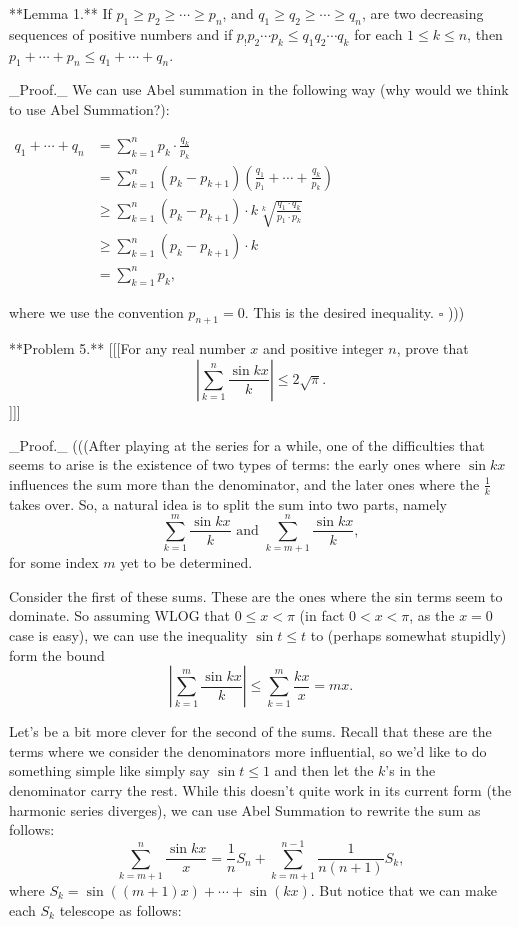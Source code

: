 **Lemma 1.** If $p_1 \geq p_2 \geq \cdots \geq p_n$, and $q_1 \geq q_2 \geq \cdots \geq q_n$, are two decreasing sequences of positive numbers and if $p_! p_2 \cdots p_k \leq q_1 q_2 \cdots q_k$ for each $1 \leq k \leq n$, then $p_1 + \cdots + p_n \leq q_1 + \cdots + q_n$.  


_Proof._ We can use Abel summation in the following way (why would we think to use Abel Summation?):  

$\begin{align*}
q_1 + \cdots + q_n
&= \sum_{k=1}^n p_k \cdot \frac{q_k}{p_k} \\
&= \sum_{k=1}^n (p_k - p_{k+1}) \left( \frac{q_1}{p_1} + \cdots + \frac{q_k}{p_k} \right) \\
&\geq \sum_{k=1}^n (p_k - p_{k+1}) \cdot k \sqrt[k]{\frac{q_1 \cdot q_k}{p_1 \cdot p_k}} \\
&\geq \sum_{k=1}^n (p_k - p_{k+1}) \cdot k \\
&= \sum_{k=1}^n p_k, 
\end{align*}$  

where we use the convention $p_{n+1} = 0$. This is the desired inequality. $\square$  )))

**Problem 5.** [[[For any real number $x$ and positive integer $n$, prove that  
\[ \left | \sum_{k=1}^n \frac{\sin kx}{k} \right | \leq 2 \sqrt{\pi}. \] ]]]

_Proof._ (((After playing at the series for a while, one of the difficulties that seems to arise is the existence of two types of terms: the early ones where $\sin kx$ influences the sum more than the denominator, and the later ones where the $\frac{1}{k}$ takes over. So, a natural idea is to split the sum into two parts, namely  
\[ \sum_{k=1}^m \frac{\sin kx}{k} \text{ and } \sum_{k=m+1}^n \frac{\sin kx}{k}, \]  
for some index $m$ yet to be determined.  

Consider the first of these sums. These are the ones where the sin terms seem to dominate. So assuming WLOG that $0 \leq x < \pi$ (in fact $0 < x < \pi$, as the $x=0$ case is easy), we can use the inequality $\sin t \leq t$ to (perhaps somewhat stupidly) form the bound  
\[  \left | \sum_{k=1}^m \frac{\sin kx}{k} \right | \leq \sum_{k=1}^m \frac{kx}{x} = mx. \]  

Let’s be a bit more clever for the second of the sums. Recall that these are the terms where we consider the denominators more influential, so we’d like to do something simple like simply say $\sin t \leq 1$ and then let the $k$'s in the denominator carry the rest. While this doesn’t quite work in its current form (the harmonic series diverges), we can use Abel Summation to rewrite the sum as follows: 
\[ \sum_{k=m+1}^n \frac{\sin kx}{x} = \frac{1}{n} S_n + \sum_{k=m+1}^{n-1} \frac{1}{n(n+1)} S_k, \tag{5} \]  
where $S_k = \sin((m+1)x) + \cdots + \sin(kx)$. But notice that we can make each $S_k$ telescope as follows: 

